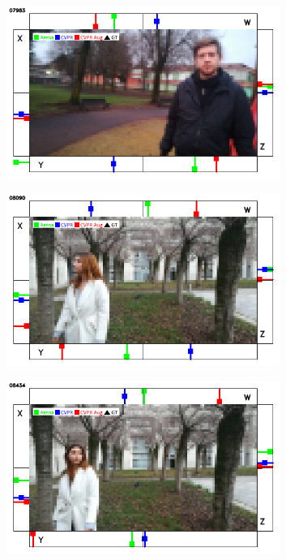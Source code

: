 \begin{figure}[H]
\begin{center}
\begin{subfigure}[h]{0.49\textwidth}
		\end{subfigure}
		\hfill
		\begin{subfigure}[h]{0.49\textwidth}
			\centering
			\includegraphics[width=0.98\textwidth]{"contents/images/qualitative-videos/W-bias-park01-7983"}
		\end{subfigure}
		\vfill
		\begin{subfigure}[h]{0.49\textwidth}
			\centering
			\includegraphics[width=0.98\textwidth]{"contents/images/qualitative-videos/W-bias-square01-8090"}
		\end{subfigure}
		\hfill
		\begin{subfigure}[h]{0.49\textwidth}
			\centering
			\includegraphics[width=0.98\textwidth]{"contents/images/qualitative-videos/W-bias-square01-8434"}

\end{subfigure}
\end{center}
\end{figure}
